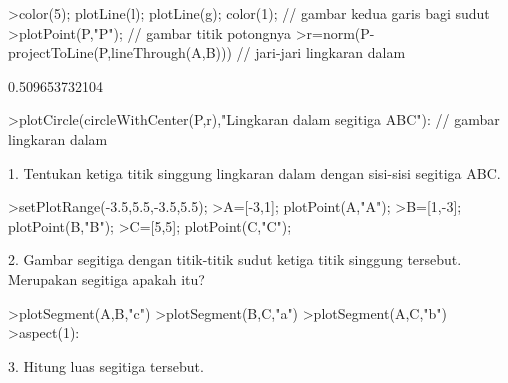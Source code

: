 \documentclass[a4paper,10pt]{article}
\begin{document}
\begin{eulernotebook}
\begin{eulercomment}
\begin{eulercomment}
\begin{eulercomment}
\begin{eulercomment}
\begin{eulercomment}
\begin{eulercomment}
\begin{eulercomment}
\begin{eulercomment}
\begin{eulercomment}
\begin{eulercomment}
\begin{eulercomment}
\begin{eulercomment}
\begin{eulercomment}
\begin{eulercomment}
\begin{eulercomment}
\begin{eulercomment}
\begin{eulercomment}
\begin{eulercomment}
\begin{eulercomment}
\begin{eulercomment}
\begin{eulercomment}
\begin{eulercomment}
\begin{eulercomment}
\begin{eulercomment}
\begin{eulercomment}
\begin{eulercomment}
\begin{eulercomment}
\begin{eulercomment}
\begin{eulercomment}
\begin{eulercomment}
\begin{eulercomment}
\begin{eulercomment}
\begin{eulercomment}
\begin{eulercomment}
\begin{eulercomment}
\begin{eulercomment}
\begin{eulercomment}
\begin{eulercomment}
\begin{eulercomment}
\end{eulercomment}
\begin{eulerprompt}
>color(5); plotLine(l); plotLine(g); color(1); // gambar kedua garis bagi sudut
>plotPoint(P,"P"); // gambar titik potongnya
>r=norm(P-projectToLine(P,lineThrough(A,B))) // jari-jari lingkaran dalam
\end{eulerprompt}
\begin{euleroutput}
  0.509653732104
\end{euleroutput}
\begin{eulerprompt}
>plotCircle(circleWithCenter(P,r),"Lingkaran dalam segitiga ABC"): // gambar lingkaran dalam
\end{eulerprompt}
\begin{eulercomment}
1. Tentukan ketiga titik singgung lingkaran dalam dengan sisi-sisi
segitiga ABC.
\end{eulercomment}
\begin{eulerprompt}
>setPlotRange(-3.5,5.5,-3.5,5.5);
>A=[-3,1]; plotPoint(A,"A");
>B=[1,-3]; plotPoint(B,"B");
>C=[5,5]; plotPoint(C,"C");
\end{eulerprompt}
\begin{eulercomment}
2. Gambar segitiga dengan titik-titik sudut ketiga titik singgung
tersebut. Merupakan segitiga apakah itu?
\end{eulercomment}
\begin{eulerprompt}
>plotSegment(A,B,"c")
>plotSegment(B,C,"a")
>plotSegment(A,C,"b")
>aspect(1):
\end{eulerprompt}
\begin{eulercomment}
3. Hitung luas segitiga tersebut.
\end{eulercomment}

\end{eulercomment}
\end{eulercomment}
\end{eulercomment}
\end{eulercomment}
\end{eulercomment}
\end{eulercomment}
\end{eulercomment}
\end{eulercomment}
\end{eulercomment}
\end{eulercomment}
\end{eulercomment}
\end{eulercomment}
\end{eulercomment}
\end{eulercomment}
\end{eulercomment}
\end{eulercomment}
\end{eulercomment}
\end{eulercomment}
\end{eulercomment}
\end{eulercomment}
\end{eulercomment}
\end{eulercomment}
\end{eulercomment}
\end{eulercomment}
\end{eulercomment}
\end{eulercomment}
\end{eulercomment}
\end{eulercomment}
\end{eulercomment}
\end{eulercomment}
\end{eulercomment}
\end{eulercomment}
\end{eulercomment}
\end{eulercomment}
\end{eulercomment}
\end{eulercomment}
\end{eulercomment}
\end{eulercomment}
\end{eulernotebook}
\end{document}
